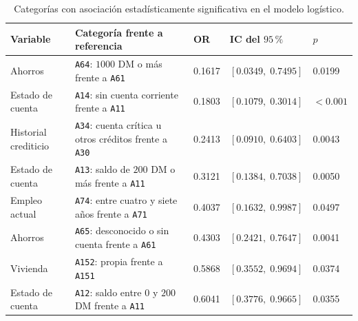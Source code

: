 \begin{table}[H]
    \centering
    \caption{Categorías con asociación estadísticamente significativa en
    el modelo logístico.}
    \label{tab:or-categoricos}

    \footnotesize
    \begin{tabularx}{\textwidth}{
        @{}
        >{\raggedright\arraybackslash}p{3.4cm}
        >{\raggedright\arraybackslash}p{4.1cm}
        >{\centering\arraybackslash}p{1.3cm}
        >{\centering\arraybackslash}p{2.5cm}
        >{\centering\arraybackslash}p{1.4cm}
        @{}
    }
        \toprule
        Variable
        & Categoría frente a referencia
        & OR
        & IC del \(95\,\%\)
        & \(p\) \\
        \midrule

        Ahorros
        & \texttt{A64}: \(1000\) DM o más
          frente a \texttt{A61}
        & \num{0.1617}
        & \([0.0349,\;0.7495]\)
        & \num{0.0199} \\

        Estado de cuenta
        & \texttt{A14}: sin cuenta corriente
          frente a \texttt{A11}
        & \num{0.1803}
        & \([0.1079,\;0.3014]\)
        & \(<0.001\) \\

        Historial crediticio
        & \texttt{A34}: cuenta crítica u otros créditos
          frente a \texttt{A30}
        & \num{0.2413}
        & \([0.0910,\;0.6403]\)
        & \num{0.0043} \\

        Estado de cuenta
        & \texttt{A13}: saldo de \(200\) DM o más
          frente a \texttt{A11}
        & \num{0.3121}
        & \([0.1384,\;0.7038]\)
        & \num{0.0050} \\

        Empleo actual
        & \texttt{A74}: entre cuatro y siete años
          frente a \texttt{A71}
        & \num{0.4037}
        & \([0.1632,\;0.9987]\)
        & \num{0.0497} \\

        Ahorros
        & \texttt{A65}: desconocido o sin cuenta
          frente a \texttt{A61}
        & \num{0.4303}
        & \([0.2421,\;0.7647]\)
        & \num{0.0041} \\

        Vivienda
        & \texttt{A152}: propia
          frente a \texttt{A151}
        & \num{0.5868}
        & \([0.3552,\;0.9694]\)
        & \num{0.0374} \\

        Estado de cuenta
        & \texttt{A12}: saldo entre \(0\) y \(200\) DM
          frente a \texttt{A11}
        & \num{0.6041}
        & \([0.3776,\;0.9665]\)
        & \num{0.0355} \\

        \bottomrule
    \end{tabularx}
\end{table}

